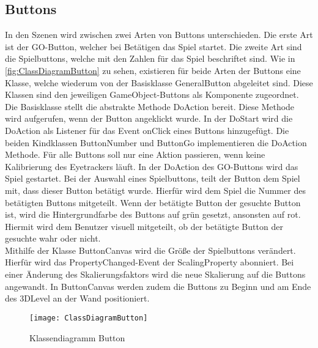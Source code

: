 \subsection{Buttons}
In den Szenen wird zwischen zwei Arten von Buttons unterschieden. Die erste Art ist der GO-Button, welcher bei Betätigen das Spiel startet. Die zweite Art sind die Spielbuttons, welche mit den Zahlen für das Spiel beschriftet sind. Wie in \autoref{fig:ClassDiagramButton} zu sehen, existieren für beide Arten der Buttons eine Klasse, welche wiederum von der Basisklasse \glqq GeneralButton\grqq{} abgeleitet sind. Diese Klassen sind den jeweiligen GameObject-Buttons als Komponente zugeordnet. Die Basisklasse stellt die abstrakte Methode DoAction bereit. Diese Methode wird aufgerufen, wenn der Button angeklickt wurde. In der DoStart wird die DoAction als Listener für das Event onClick eines Buttons hinzugefügt. Die beiden Kindklassen ButtonNumber und ButtonGo implementieren die DoAction Methode. Für alle Buttons soll nur eine Aktion passieren, wenn keine Kalibrierung des Eyetrackers läuft. In der DoAction des GO-Buttons wird das Spiel gestartet. Bei der Auswahl eines Spielbuttons, teilt der Button dem Spiel mit, dass dieser Button betätigt wurde. Hierfür wird dem Spiel die Nummer des betätigten Buttons mitgeteilt. Wenn der betätigte Button der gesuchte Button ist, wird die Hintergrundfarbe des Buttons auf grün gesetzt, ansonsten auf rot. Hiermit wird dem Benutzer visuell mitgeteilt, ob der betätigte Button der gesuchte wahr oder nicht. \\
Mithilfe der Klasse \glqq ButtonCanvas\grqq{} wird die Größe der Spielbuttons verändert. Hierfür wird das PropertyChanged-Event der ScalingProperty abonniert. Bei einer Änderung des Skalierungsfaktors wird die neue Skalierung auf die Buttons angewandt. In ButtonCanvas werden zudem die Buttons zu Beginn und am Ende des 3DLevel an der Wand positioniert. 

\begin{figure}[!htbp]
	\centering
	\texttt{[image: ClassDiagramButton]}
	\caption[Klassendiagramm Button]{Klassendiagramm Button}
	\label{fig:ClassDiagramButton}
\end{figure}

